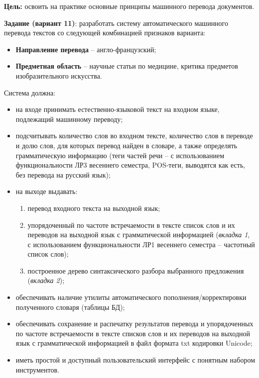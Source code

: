 
\textbf{Цель:} освоить на практике основные принципы машинного перевода
документов.

\vspace{1em}

\textbf{Задание (вариант 11)}: разработать систему автоматического
машинного перевода текстов со следующей комбинацией признаков варианта:
\begin{itemize}
  \item \textbf{Направление перевода} -- англо-французский;
  \item \textbf{Предметная область} -- научные статьи по медицине,
  критика предметов изобразительного искусства.
\end{itemize}

\vspace{1em}

Система должна:
\begin{itemize}
  \item на входе принимать естественно-языковой текст на входном языке,
  подлежащий машинному переводу;
  \item подсчитывать количество слов во входном тексте, количество
  слов в переводе и долю слов, для которых перевод найден в словаре, а
  также определять грамматическую информацию (теги частей речи -- с
  использованием функциональности ЛР3 весеннего семестра, POS-теги,
  выводятся как есть, без перевода на русский язык);
  \item на выходе выдавать:
  \begin{enumerate}
    \item перевод входного текста на выходной язык;
    \item упорядоченный по частоте встречаемости в тексте список слов
    и их переводов на выходной язык с грамматической информацией
    (\emph{вкладка 1}, с использованием функциональности ЛР1
    весеннего семестра -- частотный список слов);
    \item построенное дерево синтаксического разбора выбранного
    предложения (\emph{вкладка 2});
  \end{enumerate}
  \item обеспечивать наличие утилиты автоматического
  пополнения/корректировки полученного словаря (таблицы БД);
  \item обеспечивать сохранение и распечатку результатов перевода и
  упорядоченных по частоте встречаемости в тексте списков слов и их
  переводов на выходной язык с грамматической информацией в файл
  формата txt кодировки Unicode;
  \item иметь простой и доступный пользовательский интерфейс с понятным
  набором инструментов.
\end{itemize}

